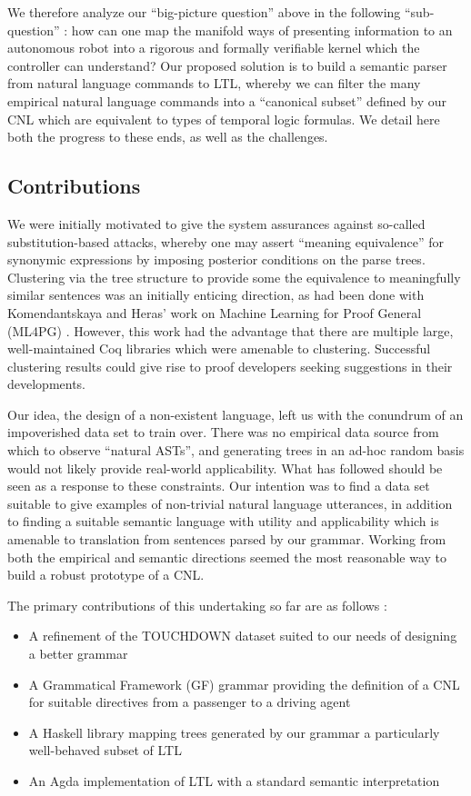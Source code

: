 \documentclass{article}
\begin{document}
We therefore analyze our ``big-picture question'' above in the following
``sub-question'' : how can one map the manifold ways of presenting information
to an autonomous robot into a rigorous and formally verifiable kernel which the
controller can understand? Our proposed solution is to build a semantic parser
from natural language commands to LTL, whereby we can filter the many empirical
natural language commands into a ``canonical subset'' defined by our CNL which
are equivalent to types of temporal logic formulas. We detail here both the
progress to these ends, as well as the challenges.

\subsection{Contributions}

We were initially motivated to give the system assurances against so-called
substitution-based attacks, whereby one may assert ``meaning equivalence'' for
synonymic expressions by imposing posterior conditions on the parse trees.
Clustering via the tree structure to provide some the equivalence to
meaningfully similar sentences was an initially enticing direction, as had been
done with Komendantskaya and Heras' work on Machine Learning for Proof General
(ML4PG) \cite{ml4pg}. However, this work had the advantage that there are
multiple large, well-maintained Coq libraries which were amenable to clustering.
Successful clustering results could give rise to proof developers seeking
suggestions in their developments.

Our idea, the design of a non-existent language, left us with the conundrum
of an impoverished data set to train over. There was no empirical data source
from which to observe ``natural ASTs'', and generating trees in an ad-hoc random basis would
not likely provide real-world applicability. What has followed should be seen as
a response to these constraints. Our intention was to find a data set suitable
to give examples of non-trivial natural language utterances, in addition to
finding a suitable semantic language with utility and applicability which is
amenable to translation from sentences parsed by our grammar. Working from both
the empirical and semantic directions seemed the most reasonable way to build a
robust prototype of a CNL.

The primary contributions of this undertaking so far are as follows :

\begin{itemize}[noitemsep]
\item A refinement of the TOUCHDOWN dataset \cite{chen2019touchdown} suited to
our needs of designing a better grammar
\item A Grammatical Framework (GF) grammar providing the definition of a CNL for
suitable directives from a passenger to a driving agent
\item A Haskell library mapping trees generated by our grammar a particularly well-behaved subset of LTL
\item An Agda implementation of LTL with a standard semantic interpretation
\end{itemize}
\end{document}
